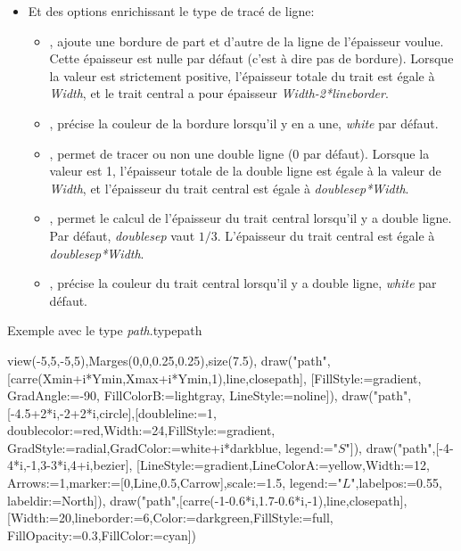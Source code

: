 \begin{itemize}
\begin{itemize}
  \end{itemize}
 \item Et des options enrichissant le type de tracé de ligne:\label{optionsline}
  \begin{itemize}
  \item {}, ajoute une bordure de part et d'autre de la ligne de l'épaisseur voulue. Cette épaisseur est nulle par défaut (c'est à dire pas de bordure). Lorsque la valeur est strictement positive, l'épaisseur totale du trait est égale à \emph{Width}, et le trait central a pour épaisseur \emph{Width-2*lineborder}.
  \item {}, précise la couleur de la bordure lorsqu'il y en a une, \emph{white} par défaut.
  \item {}, permet de tracer ou non une double ligne (0 par défaut). Lorsque la valeur est 1, l'épaisseur totale de la double ligne est égale à la valeur de \emph{Width}, et l'épaisseur du trait central est égale à \emph{doublesep*Width}.
  \item {}, permet le calcul de l'épaisseur du trait central lorsqu'il y a double ligne. Par défaut, \emph{doublesep} vaut $1/3$. L'épaisseur du trait central est égale à \emph{doublesep*Width}.
  \item {}, précise la couleur du trait central lorsqu'il y a double ligne, \emph{white} par défaut.
  \end{itemize}
\end{itemize}  

\begin{demo}{Exemple avec le type \emph{path}.}{typepath}
\begin{texgraph}[name=typepath]
view(-5,5,-5,5),Marges(0,0,0.25,0.25),size(7.5),
draw("path",[carre(Xmin+i*Ymin,Xmax+i*Ymin,1),line,closepath],
 [FillStyle:=gradient, GradAngle:=-90, FillColorB:=lightgray,
 LineStyle:=noline]),
draw("path",[-4.5+2*i,-2+2*i,circle],[doubleline:=1,
 doublecolor:=red,Width:=24,FillStyle:=gradient,
 GradStyle:=radial,GradColor:=white+i*darkblue,
 legend:="$S$"]),
draw("path",[-4-4*i,-1,3-3*i,4+i,bezier],
 [LineStyle:=gradient,LineColorA:=yellow,Width:=12,
 Arrows:=1,marker:=[0,Line,0.5,Carrow],scale:=1.5,
 legend:="$L$",labelpos:=0.55, labeldir:=North]),
draw("path",[carre(-1-0.6*i,1.7-0.6*i,-1),line,closepath],
 [Width:=20,lineborder:=6,Color:=darkgreen,FillStyle:=full,
  FillOpacity:=0.3,FillColor:=cyan]) 
\end{texgraph}
\end{demo}

